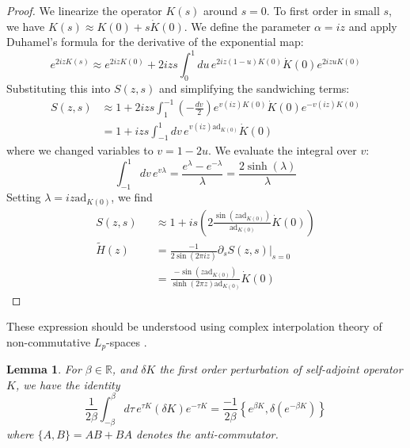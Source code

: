 \documentclass[a4paper,11pt]{article}
\newtheorem{lemma}[theorem]{Lemma}
\theoremstyle{definition}
\newcommand{\nn}{\nonumber}
\newcommand{\p}{\partial}
\newcommand{\ad}{\text{ad}}
\begin{document}
\begin{proof}
We linearize the operator $K(s)$ around $s=0$. To first order in small $s$, we have $K(s) \approx K(0) + s \dot{K}(0)$.
We define the parameter $\alpha = iz$ and apply Duhamel's formula for the derivative of the exponential map:
\begin{equation}
    e^{2iz K(s)} \approx e^{2iz K(0)} + 2iz s \int_0^1 du \, e^{2iz(1-u)K(0)} \dot{K}(0) e^{2iz u K(0)}
\end{equation}
Substituting this into $S(z,s)$ and simplifying the sandwiching terms:
\begin{align}
    S(z, s) &\approx 1 + 2iz s \int_{1}^{-1} \left(-\frac{dv}{2}\right) e^{v (iz) K(0)} \dot{K}(0) e^{-v (iz) K(0)} \\
      &= 1 + iz s \int_{-1}^{1} dv \, e^{v (iz) \ad_{K(0)}} \dot{K}(0)
\end{align}
where we changed variables to $v=1-2u$. We evaluate the integral over $v$:
\begin{equation}
    \int_{-1}^{1} dv \, e^{v \lambda} = \frac{e^{\lambda} - e^{-\lambda}}{\lambda} = \frac{2\sinh(\lambda)}{\lambda}
\end{equation}
Setting $\lambda = iz \ad_{K(0)}$, we find
\begin{eqnarray}
    S(z, s) &&\approx 1 + i s \left( 2\frac{\sin(z \ad_{K(0)})}{ \ad_{K(0)}} \dot{K}(0) \right)\nn\\
    \tilde{H}(z) &&= \frac{{-}1}{2\sin(2\pi iz)} \p_s S(z, s)\Big|_{s=0} \nn \\
    &&= \frac{{-}\sin(z \ad_{K(0)})}{\sinh(2\pi z) \ad_{K(0)}} \dot{K}(0)
\end{eqnarray}
\end{proof}
These expression should be understood using complex interpolation theory of non-commutative $L_p$-spaces \cite{furuya2023monotonic}.
\begin{lemma}\label{lemmaanitocmmuteApp}
For $\beta \in \mathbb{R}$, and $\delta K$ the first order perturbation of self-adjoint operator $K$, we have the identity
\begin{equation}
    \frac{1}{2\beta} \int_{-\beta}^\beta d\tau \, e^{\tau K} (\delta K) e^{-\tau K} = \frac{-1}{2\beta} \left\{ e^{\beta K}, \delta(e^{-\beta K}) \right\}
\end{equation}
where $\{A, B\} = AB + BA$ denotes the anti-commutator.
\end{lemma}
\end{document}
